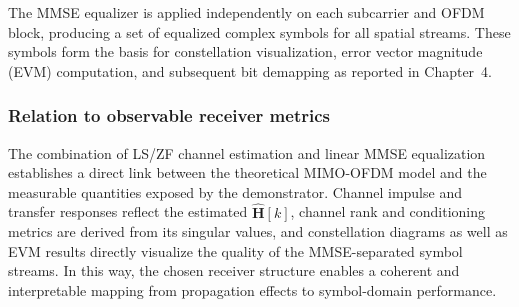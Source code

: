 The MMSE equalizer is applied independently on each subcarrier and OFDM block, producing a set of equalized complex symbols for all spatial streams. These symbols form the basis for constellation visualization, error vector magnitude (EVM) computation, and subsequent bit demapping as reported in Chapter~4.

\subsubsection{Relation to observable receiver metrics}

The combination of LS/ZF channel estimation and linear MMSE equalization establishes a direct link between the theoretical MIMO-OFDM model and the measurable quantities exposed by the demonstrator. Channel impulse and transfer responses reflect the estimated $\hat{\mathbf{H}}[k]$, channel rank and conditioning metrics are derived from its singular values, and constellation diagrams as well as EVM results directly visualize the quality of the MMSE-separated symbol streams. In this way, the chosen receiver structure enables a coherent and interpretable mapping from propagation effects to symbol-domain performance.
